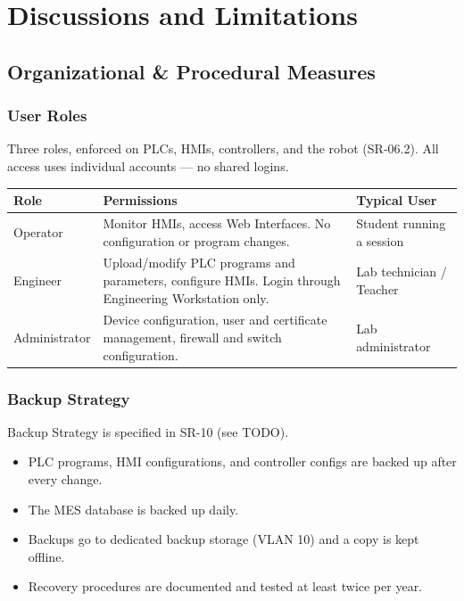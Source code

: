 \section{Discussions and Limitations}

\subsection{Organizational \& Procedural Measures}

\subsubsection{User Roles}
Three roles, enforced on PLCs, HMIs, controllers, and the robot (SR-06.2). All access uses individual accounts — no shared logins. \\

\renewcommand{\arraystretch}{1.3} %
\begin{tabularx}{\textwidth}{p{2.5cm} X X}
    \textbf{Role} & \textbf{Permissions} & \textbf{Typical User} \vspace{0.5em}\\
\toprule
    Operator & Monitor HMIs, access Web Interfaces. No configuration or program changes. & Student running a session \\
    \midrule
    Engineer & Upload/modify PLC programs and parameters, configure HMIs. Login through Engineering Workstation only. & Lab technician / Teacher \\
    \midrule
    Administrator &  Device configuration, user and certificate management, firewall and switch configuration. &  Lab administrator \\
    \bottomrule
\end{tabularx}
\vspace{1em}

\subsubsection{Backup Strategy}
Backup Strategy is specified in SR-10 (see TODO).

\begin{itemize}
    \item PLC programs, HMI configurations, and controller configs are backed up after every change.
    \item The MES database is backed up daily.
    \item Backups go to dedicated backup storage (VLAN 10) and a copy is kept offline.
    \item Recovery procedures are documented and tested at least twice per year.
\end{itemize}

